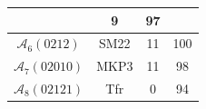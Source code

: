 \begin{table}[!t]
\begin{tabular}{|c|c||c|c|}
&

9

&

97

\\ \hline

$\mathcal{A}_{6}(0212)$

&

SM22


&

11

&

100

\\ \hline

$\mathcal{A}_{7}(02010)$

&

MKP3


&

11

&

98

\\ \hline

$\mathcal{A}_{8}(02121)$

&

Tfr


&

0

&

94

\\ \hline

 
\end{tabular}
\end{table}








%
%


